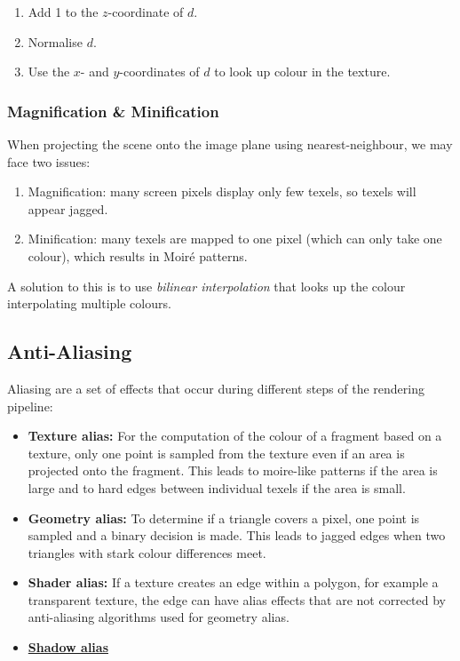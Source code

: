 \documentclass{panikzettel}
\begin{document}
\begin{enumerate}
    \item Add 1 to the $z$-coordinate of $d$.
    \item Normalise $d$.
    \item Use the $x$- and $y$-coordinates of $d$ to look up colour in the texture.
\end{enumerate}

\subsubsection*{Magnification \& Minification}
When projecting the scene onto the image plane using nearest-neighbour, we may face two issues:
\begin{enumerate}
    \item Magnification: many screen pixels display only few texels, so texels will appear jagged.
    \item Minification: many texels are mapped to one pixel (which can only take one colour), which results in Moiré patterns.
\end{enumerate}

A solution to this is to use \emph{bilinear interpolation} that looks up the colour interpolating multiple colours.

\subsection{Anti-Aliasing}
Aliasing are a set of effects that occur during different steps of the rendering pipeline:

\begin{itemize}
    \item \textbf{Texture alias:} For the computation of the colour of a fragment based on a texture, only one point is sampled from the texture even if an area is projected onto the fragment. This leads to moire-like patterns if the area is large and to hard edges between individual texels if the area is small.
    \item \textbf{Geometry alias:} To determine if a triangle covers a pixel, one point is sampled and a binary decision is made. This leads to jagged edges when two triangles with stark colour differences meet.
    \item \textbf{Shader alias:} If a texture creates an edge within a polygon, for example a transparent texture, the edge can have alias effects that are not corrected by anti-aliasing algorithms used for geometry alias.
    \item \hyperref[subsubsec::perspectiveShadowMaps]{\textbf{Shadow alias}}
\end{itemize}
\end{document}
